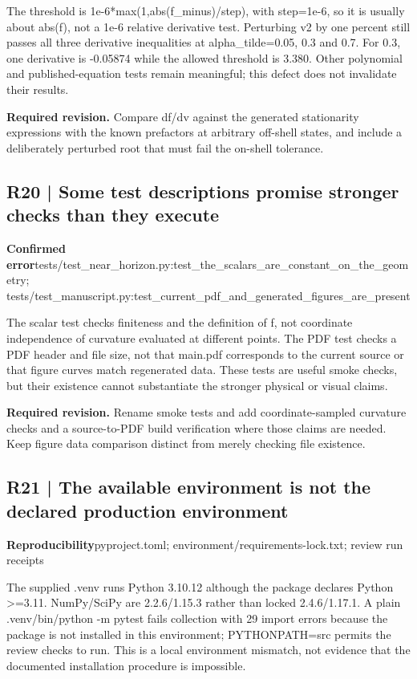 \documentclass[10pt,a4paper]{article}
\begin{document}
The threshold is 1e-6*max(1,abs(f\_minus)/step), with step=1e-6, so it is usually about abs(f), not a 1e-6 relative derivative test. Perturbing v2 by one percent still passes all three derivative inequalities at alpha\_tilde=0.05, 0.3 and 0.7. For 0.3, one derivative is -0.05874 while the allowed threshold is 3.380. Other polynomial and published-equation tests remain meaningful; this defect does not invalidate their results.

\textbf{Required revision.} Compare df/dv against the generated stationarity expressions with the known prefactors at arbitrary off-shell states, and include a deliberately perturbed root that must fail the on-shell tolerance.

\subsection*{R20 | Some test descriptions promise stronger checks than they execute}
\textbf{Confirmed error}\quad tests/test\_near\_horizon.py:test\_the\_scalars\_are\_constant\_on\_the\_geometry; tests/test\_manuscript.py:test\_current\_pdf\_and\_generated\_figures\_are\_present

The scalar test checks finiteness and the definition of f, not coordinate independence of curvature evaluated at different points. The PDF test checks a PDF header and file size, not that main.pdf corresponds to the current source or that figure curves match regenerated data. These tests are useful smoke checks, but their existence cannot substantiate the stronger physical or visual claims.

\textbf{Required revision.} Rename smoke tests and add coordinate-sampled curvature checks and a source-to-PDF build verification where those claims are needed. Keep figure data comparison distinct from merely checking file existence.

\subsection*{R21 | The available environment is not the declared production environment}
\textbf{Reproducibility}\quad pyproject.toml; environment/requirements-lock.txt; review run receipts

The supplied .venv runs Python 3.10.12 although the package declares Python \textgreater{}=3.11. NumPy/SciPy are 2.2.6/1.15.3 rather than locked 2.4.6/1.17.1. A plain .venv/bin/python -m pytest fails collection with 29 import errors because the package is not installed in this environment; PYTHONPATH=src permits the review checks to run. This is a local environment mismatch, not evidence that the documented installation procedure is impossible.
\end{document}
